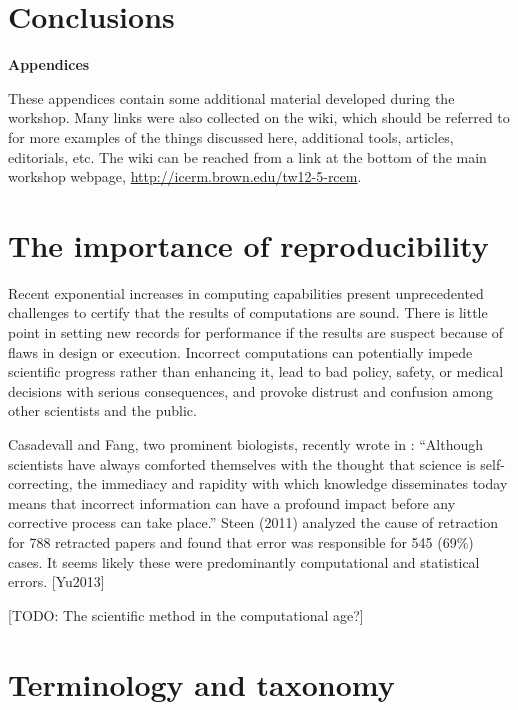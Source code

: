 \documentclass[11pt]{article}
\newcommand{\todo}[1]{{\color{red} [TODO: #1]}}
\newcommand{\todo}[1]{}
\begin{document}
\section{Conclusions} \label{sec:conclusions}




\clearpage
\appendix
\centerline{\Large\bf Appendices}
\vskip 10pt

These appendices contain some additional material developed during the
workshop.  Many links were also collected on the wiki, which should be
referred to for more examples of the things discussed here, additional
tools, articles, editorials, etc.  The wiki can be reached from a link at
the bottom of the main workshop webpage, 
\url{http://icerm.brown.edu/tw12-5-rcem}.

\section{The importance of reproducibility} \label{sec:importance}

Recent exponential increases in computing
capabilities present unprecedented challenges to certify
that the results of computations are sound.  There is little point
in setting new records for performance if the results are suspect
because of flaws in design or execution.  Incorrect computations
can potentially impede scientific progress rather than enhancing
it, lead to bad policy, safety, or medical decisions with serious
consequences, and provoke distrust and confusion among other
scientists and the public.


Casadevall and Fang, two prominent biologists, recently wrote in \cite{??}: 
``Although
scientists have always comforted themselves with the thought that science is
self-correcting, the immediacy and rapidity with which knowledge
disseminates today means that incorrect information can have a profound
impact before any corrective process can take place.'' Steen (2011) analyzed
the cause of retraction for 788 retracted papers and found that error was
responsible for 545 (69\%) cases. It seems likely these were predominantly
computational and statistical errors. [Yu2013]


\todo{The scientific method in the computational age?}

\section{Terminology and taxonomy} \label{sec:taxonomy}
\end{document}
